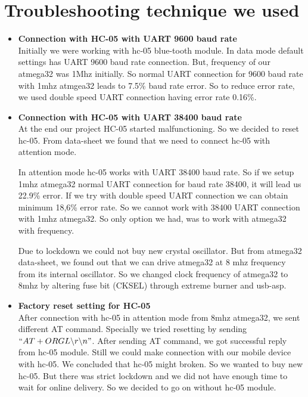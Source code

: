 \documentclass[a4paper,12pt]{article}
\begin{document}
	\section{Troubleshooting technique we used}
	\begin{itemize}
	    \item \textbf{Connection with HC-05 with UART 9600 baud rate} \\
	    Initially we were working with hc-05 blue-tooth module. In data mode default settings has UART 9600 baud rate connection. 
	    But, frequency of our atmega32 was 1Mhz initially.
	    So normal UART connection for 9600 baud rate with 1mhz atmgea32 leads to 7.5\% baud rate error. So to reduce error rate, we used double speed UART connection having error rate 0.16\%.
	    
	    \item \textbf{Connection with HC-05 with UART 38400 baud rate}\\
	    At the end our project HC-05 started malfunctioning. So we decided to reset hc-05. From data-sheet we found that we need to connect hc-05 with attention mode.
	    
	    
	    In attention mode hc-05 works with UART 38400 baud rate.
	    So if we setup 1mhz atmega32 normal UART connection for baud rate 38400, it will lead us 22.9\% error. If we try with double speed UART connection we can obtain minimum 18,6\% error rate. So we cannot work with 38400 UART connection with 1mhz atmega32. So only option we had, was to work with atmega32 with frequency.
	    
	    Due to lockdown we could not buy new crystal oscillator. But from atmega32 data-sheet, we found out that we can drive atmega32 at 8 mhz frequency from its internal oscillator. So we changed clock frequency of atmega32 to 8mhz by altering fuse bit (CKSEL) through extreme burner and usb-asp.
	    
	    \item \textbf{Factory reset setting for HC-05}\\
	    After connection with hc-05 in attention mode from 8mhz atmega32, we sent different AT command. Specially we tried resetting by sending$``AT+ORGL\backslash r\backslash n"$.
	    After sending AT command, we got successful reply from hc-05 module.
	    Still we could make connection with our mobile device with hc-05. We concluded that hc-05 might broken. So we wanted to buy new hc-05. But there was strict lockdown and we did not have enough time to wait for online delivery. So we decided to go on without hc-05 module.
	    
	\end{itemize}
	
\end{document}
